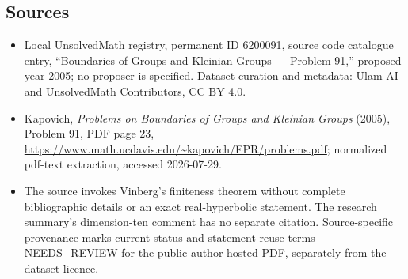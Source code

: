 \documentclass[11pt]{article}
\begin{document}
\subsection{Sources}
\begin{itemize}
\item Local UnsolvedMath registry, permanent ID 6200091, source code catalogue entry, ``Boundaries of Groups and Kleinian Groups --- Problem 91,'' proposed year 2005; no proposer is specified. Dataset curation and metadata: Ulam AI and UnsolvedMath Contributors, CC BY 4.0.
\item Kapovich, \emph{Problems on Boundaries of Groups and Kleinian Groups} (2005), Problem 91, PDF page 23, \url{https://www.math.ucdavis.edu/~kapovich/EPR/problems.pdf}; normalized pdf-text extraction, accessed 2026-07-29.
\item The source invokes Vinberg's finiteness theorem without complete bibliographic details or an exact real-hyperbolic statement. The research summary's dimension-ten comment has no separate citation. Source-specific provenance marks current status and statement-reuse terms NEEDS\_REVIEW for the public author-hosted PDF, separately from the dataset licence.
\end{itemize}
\end{document}
